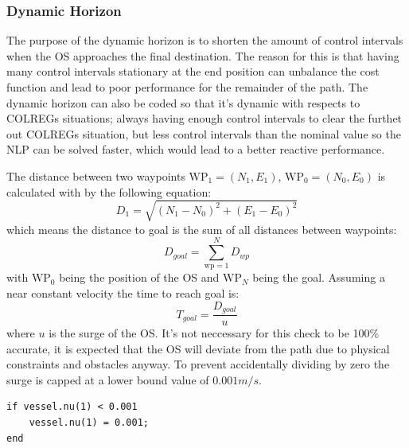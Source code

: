 \subsubsection*{Dynamic Horizon}
The purpose of the dynamic horizon is to shorten the amount of control intervals when the \gls{OS} approaches the final destination. The reason for this
is that having many control intervals stationary at the end position can unbalance the cost function and lead to poor performance for the remainder of the path.
The dynamic horizon can also be coded so that it's dynamic with respects to COLREGs situations; always having enough control intervals to clear the furthet out
COLREGs situation, but less control intervals than the nominal value so the \gls{NLP} can be solved faster, which would lead to a better reactive performance.

The distance between two waypoints $\textrm{WP}_1 = (N_1, E_1)$,  $\textrm{WP}_0 = (N_0, E_0)$  is calculated with by the following equation:
\begin{equation} \label{EQ: Distancebetweenpoints}
    D_{1} = \sqrt{(N_1 - N_0)^2 + (E_1 - E_0)^2}
\end{equation}
which means the distance to goal is the sum of all distances between waypoints:
\begin{equation}
    D_{goal} = \sum_{\textrm{wp} = 1}^{N} D_{wp}
\end{equation}
with $\textrm{WP}_0$ being the position of the \gls{OS} and $\textrm{WP}_N$ being the goal. Assuming a near constant velocity the time to
reach goal is:
\begin{equation}
    T_{goal} = \frac{D_{goal}}{u}
\end{equation}
where $u$ is the surge of the \gls{OS}. It's not neccessary for this check to be 100\% accurate, it is expected that the \gls{OS} will deviate from the
path due to physical constraints and obstacles anyway. To prevent accidentally dividing by zero the surge is capped at a lower bound value of $0.001m/s$.
\begin{lstlisting}
if vessel.nu(1) < 0.001
    vessel.nu(1) = 0.001;
end
\end{lstlisting}

